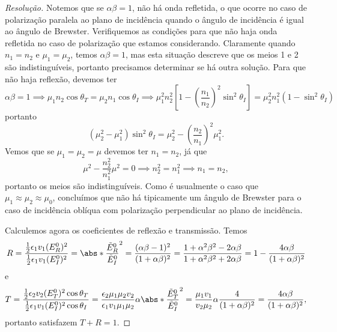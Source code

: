\begin{proof}[Resolução]
    Notemos que se \(\alpha \beta = 1\), não há onda refletida, o que ocorre no caso de polarização paralela ao plano de incidência quando o ângulo de incidência é igual ao ângulo de Brewster. Verifiquemos as condições para que não haja onda refletida no caso de polarização que estamos considerando. Claramente quando \(n_1 = n_2\) e \(\mu_1 = \mu_2\), temos \(\alpha \beta = 1\), mas esta situação descreve que os meios 1 e 2 são indistinguíveis, portanto precisamos determinar se há outra solução. Para que não haja reflexão, devemos ter
    \begin{equation*}
        \alpha \beta = 1 \implies \mu_1 n_2 \cos\theta_T = \mu_2 n_1 \cos\theta_I \implies \mu_1^2 n_2^2 \left[1 - \left(\frac{n_1}{n_2}\right)^2 \sin^2\theta_I\right] = \mu_2^2 n_1^2 \left(1 - \sin^2 \theta_I\right)
    \end{equation*}
    portanto
    \begin{equation*}
        \left(\mu_2^2 - \mu_1^2\right)\sin^2\theta_I = \mu_2^2 - \left(\frac{n_2}{n_1}\right)^2\mu_1^2.
    \end{equation*}
    Vemos que se \(\mu_1 = \mu_2 = \mu\) devemos ter \(n_1 = n_2\), já que
    \begin{equation*}
        \mu^2 - \frac{n_2^2}{n_1^2} \mu^2 = 0 \implies n_2^2 = n_1^2 \implies n_1 = n_2,
    \end{equation*}
    portanto os meios são indistinguíveis. Como é usualmente o caso que \(\mu_1 \approx \mu_2 \approx \mu_0\), concluímos que não há tipicamente um ângulo de Brewster para o caso de incidência oblíqua com polarização perpendicular ao plano de incidência.

    Calculemos agora os coeficientes de reflexão e transmissão. Temos
    \begin{equation*}
        R = \frac{\frac12 \epsilon_1 v_1 (E_R^0)^2}{\frac12 \epsilon_1 v_1 (E_I^0)^2} = \abs*{\frac{\tilde{E}_R^0}{\tilde{E}_I^0}}^2 = \frac{(\alpha \beta - 1)^2}{(1 + \alpha\beta)^2} = \frac{1 + \alpha^2\beta^2 - 2 \alpha \beta}{1 + \alpha^2\beta^2 + 2 \alpha \beta} = 1 -  \frac{4 \alpha \beta}{(1 + \alpha \beta)^2}
    \end{equation*}
    e
    \begin{equation*}
        T = \frac{\frac12 \epsilon_2 v_2 (E_T^0)^2 \cos\theta_T}{\frac12 \epsilon_1 v_1 (E_I^0)^2\cos\theta_I} = \frac{\epsilon_2 \mu_1 \mu_2 v_2}{\epsilon_1 v_1 \mu_1 \mu_2}\alpha\abs*{\frac{\tilde{E}_T^0}{\tilde{E}_I^0}}^2 = \frac{\mu_1 v_1}{v_2 \mu_2} \alpha \frac{4}{(1 + \alpha \beta)^2} = \frac{4 \alpha \beta}{(1 + \alpha \beta)^2},
    \end{equation*}
    portanto satisfazem \(T + R = 1\).
\end{proof}

